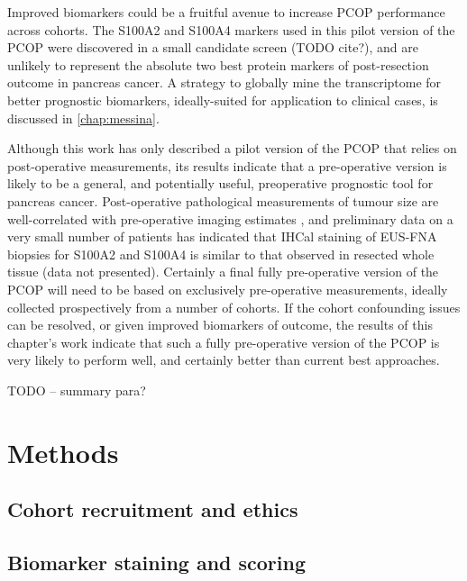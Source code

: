 \documentclass[dissertation.tex]{subfiles}
\begin{document}
Improved biomarkers could be a fruitful avenue to increase \gls{PCOP} performance across cohorts.  The S100A2 and S100A4 markers used in this pilot version of the \gls{PCOP} were discovered in a small candidate screen (TODO cite?), and are unlikely to represent the absolute two best protein markers of post-resection outcome in pancreas cancer.  A strategy to globally mine the transcriptome for better prognostic biomarkers, ideally-suited for application to clinical cases, is discussed in \cref{chap:messina}.

Although this work has only described a pilot version of the \gls{PCOP} that relies on post-operative measurements, its results indicate that a pre-operative version is likely to be a general, and potentially useful, preoperative prognostic tool for pancreas cancer.  Post-operative pathological measurements of tumour size are well-correlated with pre-operative imaging estimates \cite{Arvold2011}, and preliminary data on a very small number of patients has indicated that \gls{IHCal} staining of \gls{EUS}-\gls{FNA} biopsies for S100A2 and S100A4 is similar to that observed in resected whole tissue (data not presented).  Certainly a final fully pre-operative version of the \gls{PCOP} will need to be based on exclusively pre-operative measurements, ideally collected prospectively from a number of cohorts.  If the cohort confounding issues can be resolved, or given improved biomarkers of outcome, the results of this chapter's work indicate that such a fully pre-operative version of the \gls{PCOP} is very likely to perform well, and certainly better than current best approaches.

TODO -- summary para?

\section{Methods}
\subsection{Cohort recruitment and ethics}
\label{subsec:nomo-methods-cohort}

\subsection{Biomarker staining and scoring}
\end{document}
